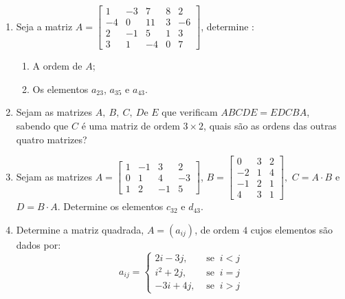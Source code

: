 \documentclass{report}
\begin{document}
\begin{Exercise}
\begin{enumerate}

\item \label{1lista3} Seja a matriz $A=\left[
\begin{array}{rrrrr}
1 & -3 & 7 & 8 & 2 \\
-4 & 0 & 11 & 3 & -6 \\
2 & -1 & 5 & 1& 3 \\
3 & 1 & -4 & 0 & 7
\end{array}
\right] $, determine :
\begin{enumerate}
 \item A ordem de $A$;
 \item Os elementos $a_{23}$, $a_{35}$ e $a_{43}$.
\end{enumerate}


\item \label{1lista4} Sejam as matrizes $A, \ B, \ C, \ D \textrm{
e } E$ que verificam $ABCDE = EDCBA$, sabendo que $C$ é uma matriz
de ordem $3 \times 2$, quais são as ordens das outras quatro
matrizes?


\item \label{1lista5} Sejam as matrizes $A=\left[
\begin{array}{rrrr}
1 & -1 & 3 & 2 \\
0 &  1 & 4 & -3 \\
1 & 2 & -1 & 5
\end{array}
\right] $,  $B=\left[
\begin{array}{rrr}
0 & 3 &  2 \\
-2 & 1 & 4 \\
-1 & 2 & 1 \\
4 & 3 & 1
\end{array}
\right],$ $C = A\cdot B$ e $D=B \cdot A$. Determine os elementos
$c_{32}$ e $d_{43}$.



\item \label{1lista6} Determine a matriz quadrada, $A=(a_{ij})$,
de ordem $4$ cujos elementos são dados por: 
$$
a_{ij}= \left\{
\begin{array}{rr}
2i-3j, & \textrm{ se }  \ i<j \\
i^2+2j, & \textrm{ se } \ i=j \\
-3i+4j, & \textrm{ se } \ i>j
\end{array}\right.
$$


\end{enumerate}
\end{Exercise}
\end{document}
